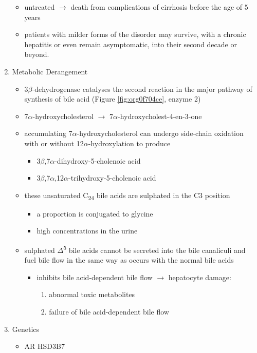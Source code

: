 \documentclass[12pt]{scrartcl}
\begin{document}
\begin{enumerate}
\begin{itemize}
\item untreated \(\to\) death from complications of cirrhosis before the age
of 5 years
\item patients with milder forms of the disorder may survive, with a
chronic hepatitis or even remain asymptomatic, into their second
decade or beyond.
\end{itemize}
\item Metabolic Derangement
\label{sec:org6dd15f4}
\begin{itemize}
\item 3\(\beta\)-dehydrogenase catalyses the second reaction in the major
pathway of synthesis of bile acid (Figure \ref{fig:org0f704ce}, enzyme 2)
\item 7\(\alpha\)-hydroxycholesterol \(\to\) 7\(\alpha\)-hydroxycholest-4-en-3-one
\item accumulating 7\(\alpha\)-hydroxycholesterol can undergo side-chain
oxidation with or without 12\(\alpha\)-hydroxylation to produce
\begin{itemize}
\item 3\(\beta\),7\(\alpha\)-dihydroxy-5-cholenoic acid
\item 3\(\beta\),7\(\alpha\),12\(\alpha\)-trihydroxy-5-cholenoic acid
\end{itemize}
\item these unsaturated C\textsubscript{24} bile acids are sulphated in the C3 position
\begin{itemize}
\item a proportion is conjugated to glycine
\item high concentrations in the urine
\end{itemize}
\item sulphated \(\Delta\)\textsuperscript{5} bile acids cannot be secreted into the bile
canaliculi and fuel bile flow in the same way as occurs with the
normal bile acids
\begin{itemize}
\item inhibits bile acid-dependent bile flow \(\to\) hepatocyte damage:
\begin{enumerate}
\item abnormal toxic metabolites
\item failure of bile acid-dependent bile flow
\end{enumerate}
\end{itemize}
\end{itemize}

\item Genetics
\label{sec:org12528a3}
\begin{itemize}
\item AR HSD3B7
\end{itemize}


\end{enumerate}
\end{document}

